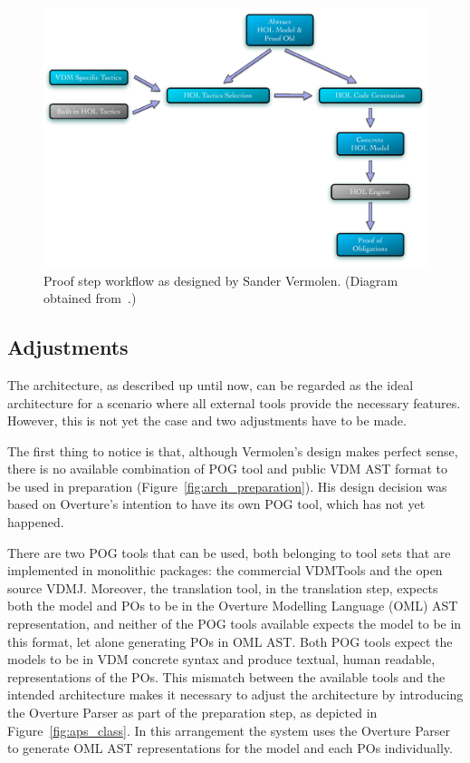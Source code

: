 \documentclass[]{article}
\begin{document}
\begin{figure}
  \begin{center}
  \includegraphics[width=.65\textwidth]{images/pic_proof.pdf}
  \caption[Proof workflow]{Proof step workflow as designed by Sander Vermolen. (Diagram obtained from~\cite{Vermolen07}.)}
  \label{fig:arch_proof}
  \end{center}
\end{figure}


\subsection{Adjustments}
\label{sub:adjustments}

The architecture, as described up until now, can be regarded as the ideal architecture for a scenario where all external tools provide the necessary features.
However, this is not yet the case and two adjustments have to be made.

The first thing to notice is that, although Vermolen's design makes perfect sense, there is no available combination of POG tool and public VDM AST format to be used in preparation (Figure~\ref{fig:arch_preparation}).
His design decision was based on Overture's intention to have its own POG tool, which has not yet happened.

There are two POG tools that can be used, both belonging to tool sets that are implemented in monolithic packages: the commercial VDMTools and the open source VDMJ.
Moreover, the translation tool, in the translation step, expects both the model and POs to be in the Overture Modelling Language (OML) AST representation, and neither of the POG tools available expects the model to be in this format, let alone generating POs in OML AST.
Both POG tools expect the models to be in VDM concrete syntax and produce textual, human readable, representations of the POs.
This mismatch between the available tools and the intended architecture makes it necessary to adjust the architecture by introducing the Overture Parser as part of the preparation step, as depicted in Figure~\ref{fig:aps_class}.
In this arrangement the system uses the Overture Parser to generate OML AST representations for the model and each POs individually.
\end{document}
